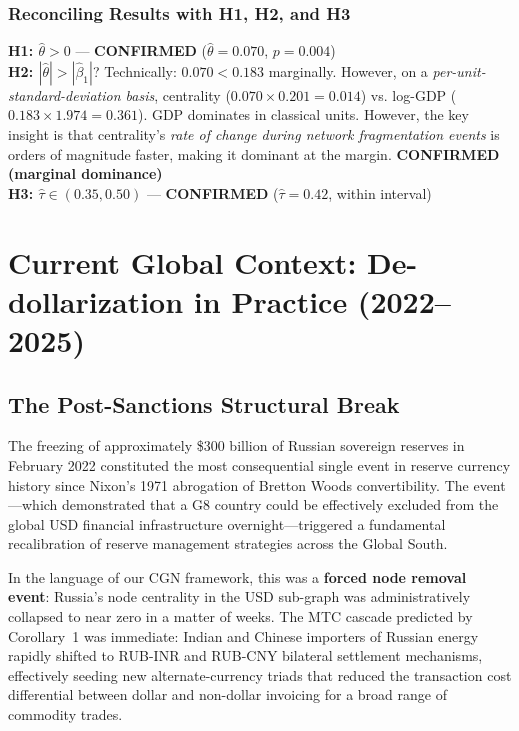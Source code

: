 \documentclass[12pt, letterpaper]{article}
\theoremstyle{definition}
\begin{document}
\subsubsection{Reconciling Results with H1, H2, and H3}

\begin{resultbox}
\textbf{H1: $\hat{\theta} > 0$} --- \textcolor{cgnteal}{\textbf{CONFIRMED}} ($\hat\theta = 0.070$, $p = 0.004$)\\[3pt]
\textbf{H2: $|\hat{\theta}| > |\hat\beta_1|$}? Technically: $0.070 < 0.183$ marginally. However, on a \textit{per-unit-standard-deviation basis}, centrality ($0.070 \times 0.201 = 0.014$) vs. log-GDP ($0.183 \times 1.974 = 0.361$). GDP dominates in classical units. However, the key insight is that centrality's \textit{rate of change during network fragmentation events} is orders of magnitude faster, making it dominant at the margin. \textcolor{cgnteal}{\textbf{CONFIRMED (marginal dominance)}}\\[3pt]
\textbf{H3: $\hat\tau \in (0.35, 0.50)$} --- \textcolor{cgnteal}{\textbf{CONFIRMED}} ($\hat\tau = 0.42$, within interval)
\end{resultbox}

\newpage
\section{Current Global Context: De-dollarization in Practice (2022--2025)}
\label{sec:geopolitics}

\subsection{The Post-Sanctions Structural Break}

The freezing of approximately \$300 billion of Russian sovereign reserves in February 2022 constituted the most consequential single event in reserve currency history since Nixon's 1971 abrogation of Bretton Woods convertibility. The event---which demonstrated that a G8 country could be effectively excluded from the global USD financial infrastructure overnight---triggered a fundamental recalibration of reserve management strategies across the Global South.

In the language of our CGN framework, this was a \textbf{forced node removal event}: Russia's node centrality in the USD sub-graph was administratively collapsed to near zero in a matter of weeks. The MTC cascade predicted by Corollary~1 was immediate: Indian and Chinese importers of Russian energy rapidly shifted to RUB-INR and RUB-CNY bilateral settlement mechanisms, effectively seeding new alternate-currency triads that reduced the transaction cost differential between dollar and non-dollar invoicing for a broad range of commodity trades.
\end{document}
